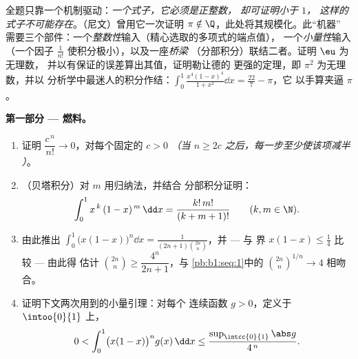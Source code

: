 \begin{problem}
\label{pb:b1:integration:1}
全题只靠一个机制驱动：\emph{一个式子，它必须是正整数，
却可证明小于 $1$，
这样的式子不可能存在}。（尼文）曾用它一次证明
$\pi \notin \Q$，此处将其规模化。此“机器”
需要三个部件：一个\emph{整数性}输入（精心选取的多项式的端点值），
一个\emph{小量性}输入（一个因子
$\frac{1}{n!}$ 使积分极小），以及一座\emph{桥梁}
（分部积分）联结二者。证明 $\eu$ 为无理数，
并以有保证的误差算出其值，证明勒让德的
更强的定理，即 $\pi^2$ 为无理数，并以
分析学中最迷人的积分作结：$\int_0^1 \frac{x^4(1 -
x)^4}{1 + x^2}\dd x = \frac{22}{7} - \pi$，它
以手算夹逼 $\pi$。

\medskip
\noindent\textbf{第一部分 --- 燃料。}
\begin{enumerate}
  \item 证明 $\dfrac{c^{\,n}}{n!} \to 0$，对每个固定的 $c
        > 0$ \emph{（当 $n \geq 2c$ 之后，每一步至少使该项减半
        ）}。
  \item （贝塔积分）对 $m$ 用归纳法，并结合
        分部积分证明：
        \[
        \int_0^1 x^{\,k}\,(1 - x)^{\,m}\,\dd x =
        \frac{k!\,m!}{(k + m + 1)!}
        \qquad (k, m \in \N).
        \]
  \item 由此推出 $\displaystyle\int_0^1 \bigl(x(1-x)\bigr)^n \dd x
        = \frac{1}{(2n+1)\binom{2n}{n}}$，并 --- 与
        界 $x(1 - x) \leq \frac14$ 比较 --- 由此得
        估计 $\binom{2n}{n} \geq \dfrac{4^n}{2n+1}$，与
        \cref{pb:b1:seq:1}中的 $\binom{2n}{n}^{1/n} \to 4$ 相吻合。
  \item 证明下文两次用到的小量引理：对每个
        连续函数 $g > 0$，定义于 $\intoo{0}{1}$ 上，
        \[
        0 < \int_0^1 \bigl(x(1-x)\bigr)^n g(x)\,\dd x
        \leq \frac{\sup_{\intcc{0}{1}}\abs g}{4^{\,n}} .
        \]
\end{enumerate}


\end{problem}
